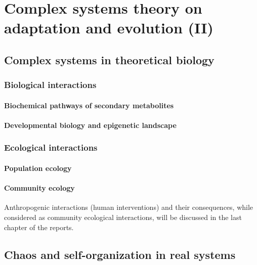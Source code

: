 \chapter{Complex systems theory on adaptation and evolution (II)}


\section{Complex systems in theoretical biology}

\subsection{Biological interactions}
\subsubsection{Biochemical pathways of secondary metabolites}
\subsubsection{Developmental biology and epigenetic landscape}

\subsection{Ecological interactions}
\subsubsection{Population ecology}
\subsubsection{Community ecology}

Anthropogenic interactions (human interventions) and their consequences, while considered as community ecological interactions, will be discussed in the last chapter of the reports.

\section{Chaos and self-organization in real systems}

